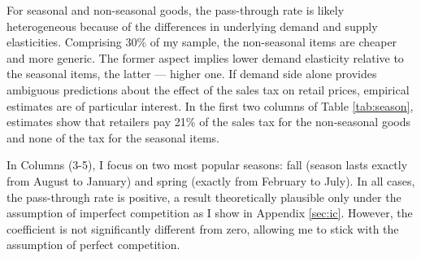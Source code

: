 \documentclass[12pt]{article}
\begin{document}
		For seasonal and non-seasonal goods, the pass-through rate is likely heterogeneous because of the differences in underlying demand and supply elasticities. Comprising 30\% of my sample, the non-seasonal items are cheaper and more generic. The former aspect implies lower demand elasticity relative to the seasonal items, the latter --- higher one. If demand side alone provides ambiguous predictions about the effect of the sales tax on retail prices, empirical estimates are of particular interest. In the first two columns of Table \ref{tab:season}, estimates show that retailers pay 21\% of the sales tax for the non-seasonal goods and none of the tax for the seasonal items.
		
		In Columns (3-5), I focus on two most popular seasons: fall (season lasts exactly from August to January) and spring (exactly from February to July). In all cases, the pass-through rate is positive, a result theoretically plausible only under the assumption of imperfect competition as I show in Appendix \ref{sec:ic}. However, the coefficient is not significantly different from zero, allowing me to stick with the assumption of perfect competition.
		
		
		
		
\end{document}

